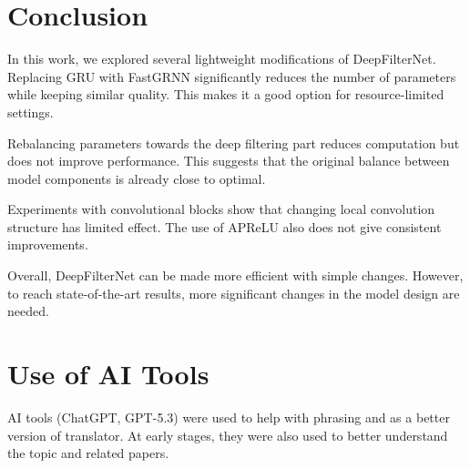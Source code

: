 \documentclass[a4paper,12pt]{extarticle}
\begin{document}
\section{Conclusion}

In this work, we explored several lightweight modifications of DeepFilterNet. Replacing GRU with
FastGRNN significantly reduces the number of parameters while keeping similar quality. This makes it
a good option for resource-limited settings.

Rebalancing parameters towards the deep filtering part reduces computation but does not improve performance. This
suggests that the original balance between model components is already close to optimal.

Experiments with convolutional blocks show that changing local convolution structure has limited effect. The use
of APReLU also does not give consistent improvements.

Overall, DeepFilterNet can be made more efficient with simple changes. However, to reach state-of-the-art results,
more significant changes in the model design are needed.

\section*{Use of AI Tools}
AI tools (ChatGPT, GPT-5.3) were used to help with phrasing and as a better version of translator. At early stages,
they were also used to better understand the topic and related papers.

\newpage 
\printbibliography[heading=bibintoc]   %
\end{document}
